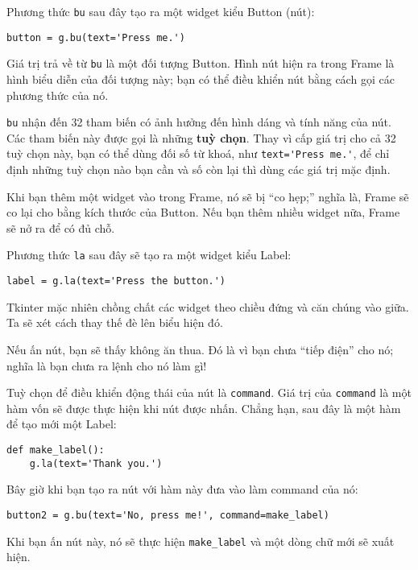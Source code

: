\documentclass[11pt]{book}
\begin{document}

Phương thức {\tt bu} sau đây tạo ra một widget kiểu Button (nút):

\beforeverb
\begin{verbatim}
button = g.bu(text='Press me.')
\end{verbatim}
\afterverb
%
Giá trị trả về từ {\tt bu} là một đối tượng Button.  Hình nút 
hiện ra trong Frame là hình biểu diễn của đối tượng này;
bạn có thể điều khiển nút bằng cách gọi các phương thức của nó.


{\tt bu} nhận đến 32 tham biến có ảnh hưởng đến hình dáng
và tính năng của nút. Các tham biến này được gọi là những
{\bf tuỳ chọn}. Thay vì cấp giá trị  cho cả 32 tuỳ chọn này,
bạn có thể dùng đối số từ khoá, như \verb"text='Press me.'",
để chỉ định những tuỳ chọn nào bạn cần và số còn lại thì dùng
các giá trị mặc định.


Khi bạn thêm một widget vào trong Frame, nó sẽ bị ``co hẹp;''
nghĩa là, Frame sẽ co lại cho bằng kích thước của Button.  Nếu bạn
thêm nhiều widget nữa, Frame sẽ nở ra để có đủ chỗ.


Phương thức {\tt la} sau đây sẽ tạo ra một widget kiểu Label:

\beforeverb
\begin{verbatim}
label = g.la(text='Press the button.')
\end{verbatim}
\afterverb
%
Tkinter mặc nhiên chồng chất các  widget theo chiều đứng và 
căn chúng vào giữa. Ta sẽ xét cách thay thế đè lên biểu hiện đó.

Nếu ấn nút, bạn sẽ thấy không ăn thua. Đó là vì bạn chưa
``tiếp điện'' cho nó; nghĩa là bạn chưa ra lệnh cho nó làm gì!

Tuỳ chọn để điều khiển động thái của nút là {\tt command}.
Giá trị của {\tt command} là một hàm vốn sẽ được thực hiện khi nút 
được nhấn. Chẳng hạn, sau đây là một hàm để tạo mới một Label:

\beforeverb
\begin{verbatim}
def make_label():
    g.la(text='Thank you.')
\end{verbatim}
\afterverb
%
Bây giờ khi bạn tạo ra nút với hàm này đưa vào làm command của nó:

\beforeverb
\begin{verbatim}
button2 = g.bu(text='No, press me!', command=make_label)
\end{verbatim}
\afterverb
%
Khi bạn ấn nút này, nó sẽ thực hiện \verb"make_label"
và một dòng chữ mới sẽ xuất hiện.
\end{document}
